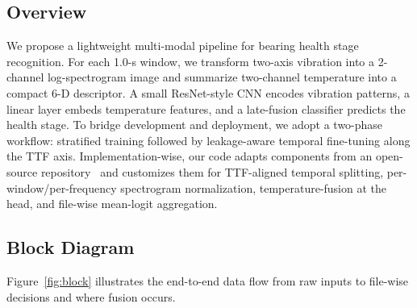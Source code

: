 \documentclass{article}
\begin{document}
\subsection{Overview}
We propose a lightweight multi-modal pipeline for bearing health stage recognition. For each 1.0-s window, we transform two-axis vibration into a 2-channel log-spectrogram image and summarize two-channel temperature into a compact 6-D descriptor. A small ResNet-style CNN encodes vibration patterns, a linear layer embeds temperature features, and a late-fusion classifier predicts the health stage. To bridge development and deployment, we adopt a two-phase workflow: stratified training followed by leakage-aware temporal fine-tuning along the TTF axis. Implementation-wise, our code adapts components from an open-source repository~\cite{mdzalfirdausi_paderborn_repo} and customizes them for TTF-aligned temporal splitting, per-window/per-frequency spectrogram normalization, temperature-fusion at the head, and file-wise mean-logit aggregation.

\subsection{Block Diagram}
Figure~\ref{fig:block} illustrates the end-to-end data flow from raw inputs to file-wise decisions and where fusion occurs.
\end{document}
